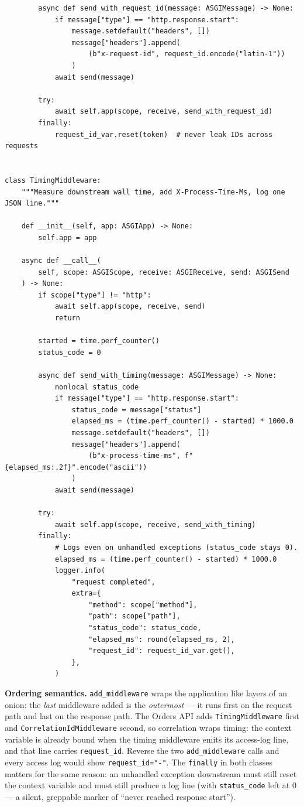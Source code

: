\begin{verbatim}
        async def send_with_request_id(message: ASGIMessage) -> None:
            if message["type"] == "http.response.start":
                message.setdefault("headers", [])
                message["headers"].append(
                    (b"x-request-id", request_id.encode("latin-1"))
                )
            await send(message)

        try:
            await self.app(scope, receive, send_with_request_id)
        finally:
            request_id_var.reset(token)  # never leak IDs across requests


class TimingMiddleware:
    """Measure downstream wall time, add X-Process-Time-Ms, log one JSON line."""

    def __init__(self, app: ASGIApp) -> None:
        self.app = app

    async def __call__(
        self, scope: ASGIScope, receive: ASGIReceive, send: ASGISend
    ) -> None:
        if scope["type"] != "http":
            await self.app(scope, receive, send)
            return

        started = time.perf_counter()
        status_code = 0

        async def send_with_timing(message: ASGIMessage) -> None:
            nonlocal status_code
            if message["type"] == "http.response.start":
                status_code = message["status"]
                elapsed_ms = (time.perf_counter() - started) * 1000.0
                message.setdefault("headers", [])
                message["headers"].append(
                    (b"x-process-time-ms", f"{elapsed_ms:.2f}".encode("ascii"))
                )
            await send(message)

        try:
            await self.app(scope, receive, send_with_timing)
        finally:
            # Logs even on unhandled exceptions (status_code stays 0).
            elapsed_ms = (time.perf_counter() - started) * 1000.0
            logger.info(
                "request completed",
                extra={
                    "method": scope["method"],
                    "path": scope["path"],
                    "status_code": status_code,
                    "elapsed_ms": round(elapsed_ms, 2),
                    "request_id": request_id_var.get(),
                },
            )
\end{verbatim}


\textbf{Ordering semantics.} \texttt{add\_middleware} wraps the application
like layers of an onion: the \emph{last} middleware added is the
\emph{outermost} --- it runs first on the request path and last on the
response path. The Orders API adds \texttt{TimingMiddleware} first and
\texttt{CorrelationIdMiddleware} second, so correlation wraps timing: the
context variable is already bound when the timing middleware emits its
access-log line, and that line carries \texttt{request\_id}. Reverse the two
\texttt{add\_middleware} calls and every access log would show
\texttt{request\_id="-"}. The \texttt{finally} in both classes matters for
the same reason: an unhandled exception downstream must still reset the
context variable and must still produce a log line (with
\texttt{status\_code} left at 0 --- a silent, greppable marker of ``never
reached response start'').

